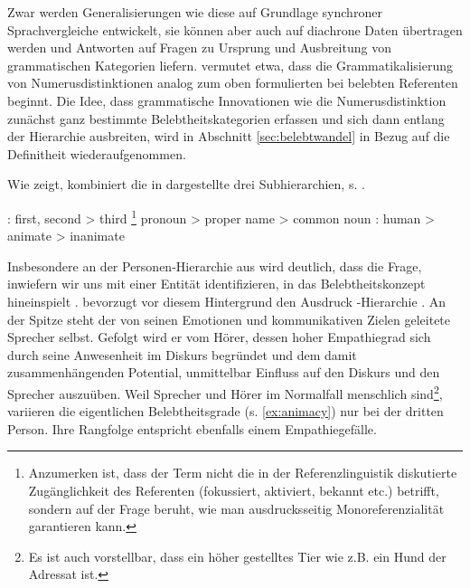 Zwar werden Generalisierungen wie diese auf Grundlage synchroner Sprachvergleiche entwickelt, sie können aber auch auf diachrone Daten übertragen werden und Antworten auf Fragen zu Ursprung und Ausbreitung von grammatischen Kategorien liefern. \textcite[265--267]{Corbett2000} vermutet etwa, dass die Grammatikalisierung von Numerusdistinktionen analog zum oben formulierten  bei belebten Referenten beginnt. Die Idee, dass grammatische Innovationen wie die Numerusdistinktion zunächst ganz bestimmte Belebtheitskategorien erfassen und sich dann entlang der Hierarchie ausbreiten, wird in Abschnitt \ref{sec:belebtwandel} in Bezug auf die Definitheit wiederaufgenommen. 

Wie \textcite[130]{Croft2006} zeigt, kombiniert die in  dargestellte   drei Subhierarchien, s. .

\begin{exe}
	\ex \label{ex:croft}
	\begin{xlist}
		\ex \label{ex:person} : first, second > third
		\ex \label{ex:referenz} \footnote{Anzumerken ist, dass der Term   nicht die in der Referenzlinguistik diskutierte Zugänglichkeit des Referenten (fokussiert, aktiviert, bekannt etc.) \parencite[vgl. etwa][]{Gundel1993} betrifft, sondern  auf der Frage beruht, wie man ausdrucksseitig Monoreferenzialität garantieren kann.} pronoun > proper name > common noun
		\ex \label{ex:animacy} : human > animate > inanimate
	\end{xlist}
\end{exe}
\noindent
Insbesondere an der Personen-Hierarchie aus  wird deutlich, dass die Frage, inwiefern wir uns mit einer Entität identifizieren, in das Belebtheitskonzept hineinspielt \parencite[10--11 u. 25--26]{Yamamoto1999}. \textcite[307--308]{Langacker1991} bevorzugt vor diesem Hintergrund den Ausdruck -Hierarchie \parencite[ebenso][]{Lehmann2004a}. An der Spitze steht der von seinen Emotionen und kommunikativen Zielen geleitete Sprecher selbst. Gefolgt wird er vom Hörer, dessen hoher Empathiegrad sich durch seine Anwesenheit im Diskurs begründet und dem damit zusammenhängenden Potential, unmittelbar Einfluss auf den Diskurs und den Sprecher auszuüben.  Weil Sprecher und Hörer im Normalfall menschlich sind\footnote{Es ist auch vorstellbar, dass ein höher gestelltes Tier wie z.B. ein Hund der Adressat ist.}, variieren die eigentlichen Belebtheitsgrade (s. \ref{ex:animacy}) nur bei der dritten Person. Ihre Rangfolge entspricht ebenfalls einem Empathiegefälle. 

